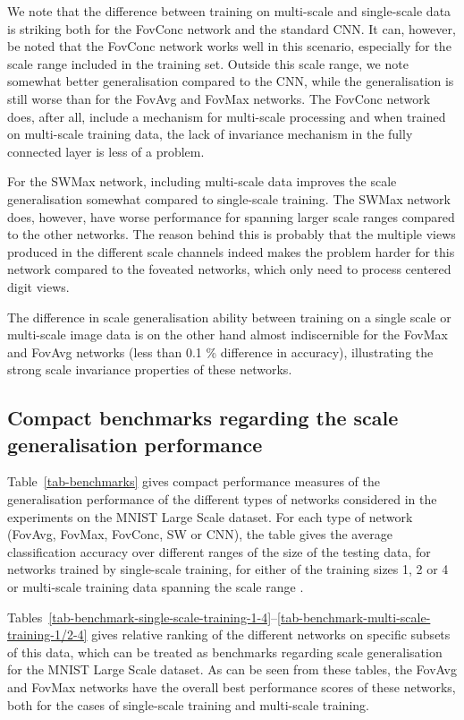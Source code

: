 \documentclass[twocolumn,runningheads]{svjour3}
\begin{document}
We note that the difference between training on multi-scale and single-scale data
is striking both for the FovConc network and the standard CNN. It can,
however, be noted that the FovConc network works well in this
scenario, especially for the scale range included in the training
set. Outside this scale range, we note somewhat better generalisation
compared to the CNN, while the generalisation is still worse than for the FovAvg and FovMax networks. The FovConc network does, after all, include a mechanism for
multi-scale processing and when trained on multi-scale training data,
the lack of invariance mechanism in the fully connected layer is less
of a problem.

For the SWMax network, including multi-scale data improves
the scale generalisation somewhat compared to single-scale training.
The SWMax network does, however, have worse performance for spanning larger scale ranges compared
to the other networks. The reason behind this is probably that the
multiple views produced in the different scale channels
indeed makes the problem harder for this network compared to the
foveated networks, which only need to process centered digit views.
 
The difference in scale generalisation ability between training on a single
scale or multi-scale image data is on the other hand almost indiscernible for the FovMax
and FovAvg networks (less than 0.1 \% difference in accuracy), illustrating the strong scale invariance properties of these networks.

\subsection{Compact benchmarks regarding the scale generalisation performance}

Table~\ref{tab-benchmarks} gives compact performance
measures of the generalisation performance of the different types of
networks considered in the experiments on the MNIST Large Scale
dataset.
For each type of network (FovAvg, FovMax, FovConc, SW or CNN), the
table gives the average classification accuracy over different ranges
of the size of the testing data, for networks trained by single-scale
training, for either of the training sizes
1, 2 or 4 or multi-scale training data spanning the
scale range .

Tables~\ref{tab-benchmark-single-scale-training-1-4}--\ref{tab-benchmark-multi-scale-training-1/2-4}
gives relative
  ranking of the different networks on specific subsets of this data,
  which can be treated as benchmarks regarding scale generalisation
  for the MNIST Large Scale dataset.
  As can be seen from these tables, the FovAvg and FovMax networks
  have the overall best performance scores of these networks, both for
  the cases of single-scale training and multi-scale training.
  
\end{document}
